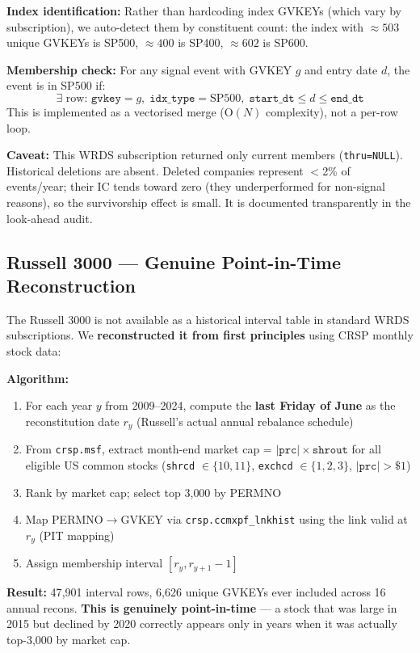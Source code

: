 \documentclass[11pt,a4paper]{article}
\begin{document}
\textbf{Index identification:} Rather than hardcoding index GVKEYs (which vary by subscription), we auto-detect them by constituent count: the index with $\approx 503$ unique GVKEYs is SP500, $\approx 400$ is SP400, $\approx 602$ is SP600.

\textbf{Membership check:} For any signal event with GVKEY $g$ and entry date $d$, the event is in SP500 if:
\[ \exists \text{ row: } \texttt{gvkey}=g,\; \texttt{idx\_type}=\text{SP500},\; \texttt{start\_dt} \le d \le \texttt{end\_dt} \]
This is implemented as a vectorised merge (O$(N)$ complexity), not a per-row loop.

\textbf{Caveat:} This WRDS subscription returned only current members (\texttt{thru=NULL}). Historical deletions are absent. Deleted companies represent $<$2\% of events/year; their IC tends toward zero (they underperformed for non-signal reasons), so the survivorship effect is small. It is documented transparently in the look-ahead audit.

\subsection{Russell 3000 --- Genuine Point-in-Time Reconstruction}

The Russell 3000 is not available as a historical interval table in standard WRDS subscriptions. We \textbf{reconstructed it from first principles} using CRSP monthly stock data:

\textbf{Algorithm:}
\begin{enumerate}[nosep]
  \item For each year $y$ from 2009--2024, compute the \textbf{last Friday of June} as the reconstitution date $r_y$ (Russell's actual annual rebalance schedule)
  \item From \texttt{crsp.msf}, extract month-end market cap = $|\texttt{prc}| \times \texttt{shrout}$ for all eligible US common stocks (\texttt{shrcd} $\in \{10,11\}$, \texttt{exchcd} $\in \{1,2,3\}$, $|\texttt{prc}|>\$1$)
  \item Rank by market cap; select top 3{,}000 by PERMNO
  \item Map PERMNO$\to$GVKEY via \texttt{crsp.ccmxpf\_lnkhist} using the link valid at $r_y$ (PIT mapping)
  \item Assign membership interval $[r_y, r_{y+1}-1]$
\end{enumerate}

\textbf{Result:} 47{,}901 interval rows, 6{,}626 unique GVKEYs ever included across 16 annual recons. \textbf{This is genuinely point-in-time} --- a stock that was large in 2015 but declined by 2020 correctly appears only in years when it was actually top-3{,}000 by market cap.
\end{document}
